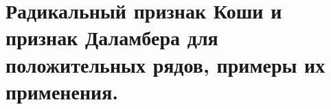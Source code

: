 \documentclass[../main.tex]{subfiles}
\begin{document}
\newpage
\section{Радикальный признак Коши и признак Даламбера для положительных рядов, примеры их применения.}
\end{document}
